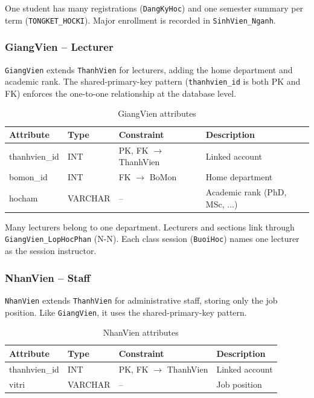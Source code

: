 \documentclass[12pt,a4paper]{report}
\begin{document}
One student has many registrations (\texttt{DangKyHoc}) and one semester summary per term (\texttt{TONGKET\_HOCKI}). Major enrollment is recorded in \texttt{SinhVien\_Nganh}.

\subsubsection{GiangVien -- Lecturer}

\texttt{GiangVien} extends \texttt{ThanhVien} for lecturers, adding the home department and academic rank. The shared-primary-key pattern (\texttt{thanhvien\_id} is both PK and FK) enforces the one-to-one relationship at the database level.

\begin{table}[H]
\renewcommand{\arraystretch}{1.35}
\caption{GiangVien attributes}
\label{tab:giangvien}
\begin{tabular}{|p{3cm}|p{2.5cm}|p{2.5cm}|p{5.5cm}|}
  \hline
  \textbf{Attribute} & \textbf{Type} & \textbf{Constraint} & \textbf{Description} \\
  \hline
  thanhvien\_id & INT & PK, FK $\to$ ThanhVien & Linked account \\
  \hline
  bomon\_id & INT & FK $\to$ BoMon & Home department \\
  \hline
  hocham & VARCHAR & -- & Academic rank (PhD, MSc, ...) \\
  \hline
\end{tabular}
\end{table}

Many lecturers belong to one department. Lecturers and sections link through \texttt{GiangVien\_LopHocPhan} (N-N). Each class session (\texttt{BuoiHoc}) names one lecturer as the session instructor.

\subsubsection{NhanVien -- Staff}

\texttt{NhanVien} extends \texttt{ThanhVien} for administrative staff, storing only the job position. Like \texttt{GiangVien}, it uses the shared-primary-key pattern.

\begin{table}[H]
\renewcommand{\arraystretch}{1.35}
\caption{NhanVien attributes}
\label{tab:nhanvien}
\begin{tabular}{|p{3cm}|p{2.5cm}|p{2.5cm}|p{5.5cm}|}
  \hline
  \textbf{Attribute} & \textbf{Type} & \textbf{Constraint} & \textbf{Description} \\
  \hline
  thanhvien\_id & INT & PK, FK $\to$ ThanhVien & Linked account \\
  \hline
  vitri & VARCHAR & -- & Job position \\
  \hline
\end{tabular}
\end{table}
\end{document}
